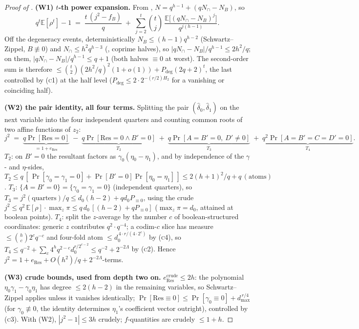 \documentclass{article}
\theoremstyle{definition}
\begin{document}
\begin{proof}[Proof of ]
\textbf{(W1) $t$-th power expansion.} From , $N = q^{h-1} + (qN_\cap - N_B)$, so
\[
q^t \mathbb{E}[\rho^t] - 1 \;=\; \frac{t\,(j^2 - f_B)}{q} \;+\; \sum_{j=2}^{t} \binom{t}{j}\, \frac{\mathbb{E}\big[(qN_\cap - N_B)^j\big]}{q^{j(h-1)}} .
\]
Off the degeneracy events, deterministically $N_B \leq (h-1)q^{h-2}$ (Schwartz--Zippel, $B \not\equiv 0$) and $N_\cap \leq h^2 q^{h-3}$ (, coprime halves), so $|qN_\cap - N_B|/q^{h-1} \leq 2h^2/q$; on them, $|qN_\cap - N_B|/q^{h-1} \leq q + 1$ (both halves $\equiv 0$ at worst). The second-order sum is therefore $\leq \binom{t}{2}(2h^2/q)^2(1 + o(1)) + P_{\deg}(2q+2)^t$, the last controlled by \textsc{(c1)} at the half level ($P_{\deg} \leq 2 \cdot 2^{-(r/2)H_2}$ for a vanishing or coinciding half).

\textbf{(W2) the pair identity, all four terms.} Splitting the pair $(\hat\delta_0, \hat\delta_1)$ on the next variable into the four independent quarters and counting common roots of two affine functions of $z_2$:
\[
j^2 \;=\; \underbrace{q\Pr[\mathrm{Res} = 0]}_{= 1 + e_{\mathrm{Res}}} \;-\; \underbrace{q\Pr[\mathrm{Res} = 0 \wedge B' = 0]}_{T_2} \;+\; \underbrace{q\Pr[A = B' = 0,\ D' \neq 0]}_{T_3} \;+\; \underbrace{q^2\Pr[A = B' = C = D' = 0]}_{T_4} .
\]
$T_2$: on $B' = 0$ the resultant factors as $\gamma_0(\eta_0 - \eta_1)$, and by independence of the $\gamma$- and $\eta$-sides, $T_2 \leq q\,[\,\Pr[\gamma_0 = \gamma_1 = 0] + \Pr[B' = 0]\Pr[\eta_0 = \eta_1]\,] \leq 2(h+1)^2/q + q\,(\text{atoms})$. $T_3$: $\{A = B' = 0\} = \{\gamma_0 = \gamma_1 = 0\}$ (independent quarters), so $T_3 = j^2(\text{quarters})/q \leq d_0 (h-2) + q d_0 P_{\equiv 0}$, using the crude $j^2 \leq q^2\, \mathbb{E}[\rho] \cdot \max_z \pi \leq q\,d_0\,[(h-2) + qP_{\equiv0}]$ ($\max_z \pi = d_0$, attained at boolean points). $T_4$: split the $z$-average by the number $c$ of boolean-structured coordinates: generic $z$ contributes $q^2 \cdot q^{-4}$; a codim-$c$ slice has measure $\leq \binom{h}{c}2^c q^{-c}$ and four-fold atom $\leq d_0^{\,4 \cdot r/(4 \cdot 2^c)}$ by \textsc{(c4)}, so $T_4 \leq q^{-2} + \sum_c 4^h q^{2-c} d_0^{r/2^{c-2}} \leq q^{-2} + 2^{-2\Lambda}$ by \textsc{(c2)}. Hence $j^2 = 1 + e_{\mathrm{Res}} + O(h^2)/q + 2^{-2\Lambda}$-terms.

\textbf{(W3) crude bounds, used from depth two on.} $e_{\mathrm{Res}}^{\mathrm{crude}} \leq 2h$: the polynomial $\eta_0\gamma_1 - \gamma_0\eta_1$ has degree $\leq 2(h-2)$ in the remaining variables, so Schwartz--Zippel applies unless it vanishes identically; $\Pr[\mathrm{Res} \equiv 0] \leq \Pr[\gamma_0 \equiv 0] + d_{\max}^{\,r/4}$ (for $\gamma_0 \not\equiv 0$, the identity determines $\eta_1$'s coefficient vector outright), controlled by \textsc{(c3)}. With (W2), $|j^2 - 1| \leq 3h$ crudely; $f$-quantities are crudely $\leq 1 + h$.


\end{proof}
\end{document}
